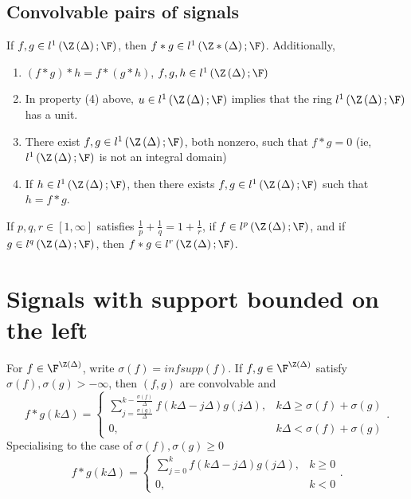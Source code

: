 \subsection{Convolvable pairs of signals}
\begin{theorem}
	If $f, g \in  l^{1}\left( \Z\left( \Delta \right) ; \F \right) $, then $f * g \in  l ^{1}\left( \Z*\left( \Delta \right) ; \F \right) $. Additionally, 
	\begin{enumerate}
		\item  $\left( f * g \right) * h = f * \left( g * h \right) $, $f,g, h \in l^{1}\left( \Z\left( \Delta \right); \F  \right) $ 
		\item In property (4) above, $u \in  l ^{1}\left( \Z\left( \Delta \right) ; \F \right) $ implies that the ring $l^{1}\left( \Z\left( \Delta \right) ; \F \right) $ has a unit.
		\item There exist $f, g \in  l ^{1}\left( \Z\left( \Delta \right) ; \F \right) $, both nonzero, such that $f * g = 0 $ (ie, $ l ^{1}\left( \Z\left( \Delta \right) ; \F \right)$ is not an integral domain)
		\item If $h \in  l^{1}\left( \Z\left( \Delta \right) ; \F \right) $, then there exists $f, g \in   l ^{1}\left( \Z\left( \Delta \right) ; \F \right)$ such that $h = f * g $. 
	\end{enumerate}
\end{theorem}
\begin{theorem}
	If $p, q, r \in  \left[ 1, \infty \right] $ satisfies $\frac{1}{p} + \frac{1}{q} = 1 + \frac{1}{r}$, if $f \in  l^{p}\left( \Z\left( \Delta \right) ; \F \right) $, and if $g \in  l^{q}\left( \Z\left( \Delta \right) ; \F \right) $, then $f * g \in  l^{r}\left( \Z\left( \Delta \right) ; \F \right)$. 
\end{theorem}
\section{Signals with support bounded on the left}

For $f \in  \F^{\Z\left( \Delta \right) }$, write $\sigma \left( f \right) = inf supp\left( f \right) $. If $f, g \in  \F^{\Z\left( \Delta \right) }$ satisfy $\sigma \left( f \right) , \sigma \left( g \right) > -\infty$, then $\left( f, g \right) $ are convolvable and
\[
	f * g \left( k \Delta \right) = \begin{cases}
		\sum_{j =  \frac{ \sigma \left( g \right)   }{\Delta} }^{k - \frac{\sigma\left( f \right) }{\Delta}} f \left( k \Delta - j \Delta \right) g \left( j \Delta \right),  & k \Delta \ge  \sigma \left( f \right) + \sigma \left( g  \right) \\
		0, & k \Delta <  \sigma \left( f \right) + \sigma \left( g  \right) 
	\end{cases}
.\]
Specialising to the case of $\sigma \left( f  \right) , \sigma\left( g  \right) \ge  0$ 
\[
	f * g \left( k \Delta \right) = \begin{cases}
		\sum_{j =  0 }^{k} f \left( k \Delta - j \Delta \right) g \left( j \Delta \right),  & k  \ge  0\\
		0, & k < 0

	\end{cases}
.\] 

